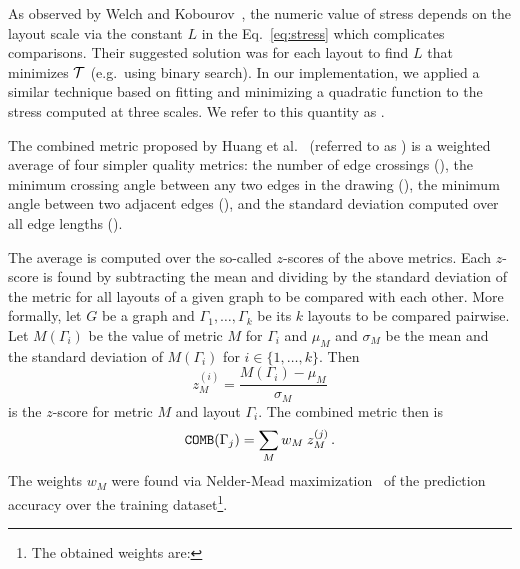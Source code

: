 As observed by Welch and Kobourov~\cite{Welch2017}, the numeric value of stress depends on the layout scale via the
constant $L$ in the Eq.~\ref{eq:stress} which complicates comparisons.  Their suggested solution was for each layout to
find $L$ that minimizes $\operatorname{\mathcal{T}}$ (e.g.~using binary search).  In our implementation, we applied a similar technique
based on fitting and minimizing a quadratic function to the stress computed at three scales.  We refer to this quantity
as .

The combined metric proposed by Huang et al.~\cite{HuangHL16} (referred to as ) is a weighted average of four
simpler quality metrics: the number of edge crossings (), the minimum crossing angle between any two edges in
the drawing (), the minimum angle between two adjacent edges (), and the standard deviation computed
over all edge lengths ().

The average is computed over the so-called $z$-scores of the above metrics.  Each $z$-score is found by subtracting the
mean and dividing by the standard deviation of the metric for all layouts of a given graph to be compared with each
other.  More formally, let $G$ be a graph and $\Gamma_1,\ldots,\Gamma_k$ be its $k$ layouts to be compared pairwise.
Let $M(\Gamma_i)$ be the value of metric $M$ for $\Gamma_i$ and $\mu_M$ and $\sigma_M$ be the mean and the standard
deviation of $M(\Gamma_i)$ for $i\in\{1,\ldots,k\}$.  Then
\begin{equation}
  z_M^{(i)} = \frac{M(\Gamma_i) - \mu_M}{\sigma_M}
\end{equation}
is the $z$-score for metric $M$ and layout $\Gamma_i$.  The combined metric then is
\begin{equation}
  \mbox{\text{\upshape\ttfamily COMB}}(\Gamma_j) = \sum_{M} w_M \: z_{M}^{(j)}
  \,.
\end{equation}
The weights $w_M$ were found via Nelder-Mead maximization~\cite{Press2007} of the prediction accuracy over the training
dataset\footnote{The obtained weights are: \TextualHuangWeights}.

